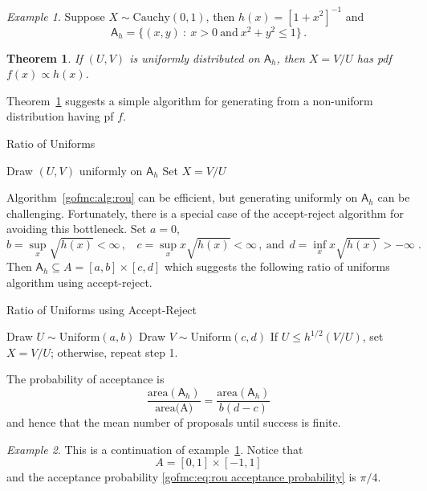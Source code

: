 \documentclass[12pt]{article}
\theoremstyle{plain}
\newtheorem{thm}{Theorem}[section]
\theoremstyle{definition}
\theoremstyle{remark}
\newtheorem{example}{Example}[section]
\newcommand{\sA}{\mathsf{A}}
\begin{document}
\begin{example}
\label{gofmc:ex:rou cauchy}
Suppose $X \sim \text{Cauchy}(0,1)$, then $h(x) = [1+x^2]^{-1}$ and
\[
\sA_h = \{(x,y)~:~ x > 0~\text{and}~x^2 + y^2 \le 1\}\, .
\]
\end{example}

\begin{thm}
\label{gofmc:thm:rou}
If $(U,V)$ is uniformly distributed on $\sA_h$, then $X=V/U$ has pdf
$f(x) \propto h(x)$.
\end{thm}
Theorem~\ref{gofmc:thm:rou} suggests a simple algorithm for
generating from a non-uniform distribution having pf $f$.

\begin{algorithm}[H]
 \caption{Ratio of Uniforms} \label{gofmc:alg:rou}
 \begin{algorithmic}[1]
 \State Draw $(U,V)$ uniformly on $\sA_h$
 \State Set $X=V/U$   
 \end{algorithmic}
\end{algorithm}

Algorithm~\ref{gofmc:alg:rou} can be efficient, but generating
uniformly on $\sA_h$ can be challenging.  Fortunately, there is a
special case of the accept-reject algorithm for avoiding this
bottleneck.  Set $a=0$,
$$
b = \sup_{x} \sqrt{h(x)} < \infty\, , ~~~~ c = \sup_{x} x \sqrt{h(x)}
< \infty\, , ~ \text{and} ~~  d = \inf_{x} x \sqrt{h(x)} > -\infty \;
. 
$$
Then $\sA_h \subseteq A=[a,b] \times [c,d]$ which suggests the
following ratio of uniforms algorithm using accept-reject.

\begin{algorithm}[H]
 \caption{Ratio of Uniforms using Accept-Reject} \label{gofmc:alg:rou-ar}
 \begin{algorithmic}[1]
   \State Draw $U\sim \text{Uniform}(a,b)$
   \State Draw $V \sim \text{Uniform}(c,d)$
 \State If $U \le h^{1/2}(V/U)$, set $X=V/U$; otherwise, repeat step 1.
 \end{algorithmic}
\end{algorithm}

The probability of acceptance is
\begin{equation}
\label{gofmc:eq:rou acceptance probability}
\frac{\text{area}(\sA_h)}{\text{area(A)}}=\frac{\text{area}(\sA_h)}{b(d-c)} 
\end{equation}
and hence that the mean number of proposals until success is finite.

\begin{example}
This is a continuation of example~\ref{gofmc:ex:rou cauchy}.  Notice that
$$
A=[0,1] \times [-1,1] 
$$
and the acceptance probability \eqref{gofmc:eq:rou acceptance
  probability} is $\pi / 4$.
\end{example}
\end{document}

